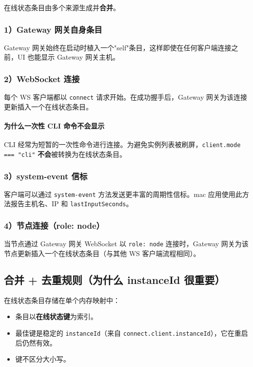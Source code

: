在线状态条目由多个来源生成并\textbf{合并}。

\subsubsection{1）Gateway 网关自身条目}


Gateway 网关始终在启动时植入一个"self"条目，这样即使在任何客户端连接之前，UI 也能显示 Gateway 网关主机。

\subsubsection{2）WebSocket 连接}


每个 WS 客户端都以 \texttt{connect} 请求开始。在成功握手后，Gateway 网关为该连接更新插入一个在线状态条目。

\paragraph{为什么一次性 CLI 命令不会显示}


CLI 经常为短暂的一次性命令进行连接。为避免实例列表被刷屏，\texttt{client.mode === "cli"} \textbf{不会}被转换为在线状态条目。

\subsubsection{3）system-event 信标}


客户端可以通过 \texttt{system-event} 方法发送更丰富的周期性信标。mac 应用使用此方法报告主机名、IP 和 \texttt{lastInputSeconds}。

\subsubsection{4）节点连接（role: node）}


当节点通过 Gateway 网关 WebSocket 以 \texttt{role: node} 连接时，Gateway 网关为该节点更新插入一个在线状态条目（与其他 WS 客户端流程相同）。

\subsection{合并 + 去重规则（为什么 instanceId 很重要）}


在线状态条目存储在单个内存映射中：

\begin{itemize}
  \item 条目以\textbf{在线状态键}为索引。
  \item 最佳键是稳定的 \texttt{instanceId}（来自 \texttt{connect.client.instanceId}），它在重启后仍然有效。
  \item 键不区分大小写。
\end{itemize}


